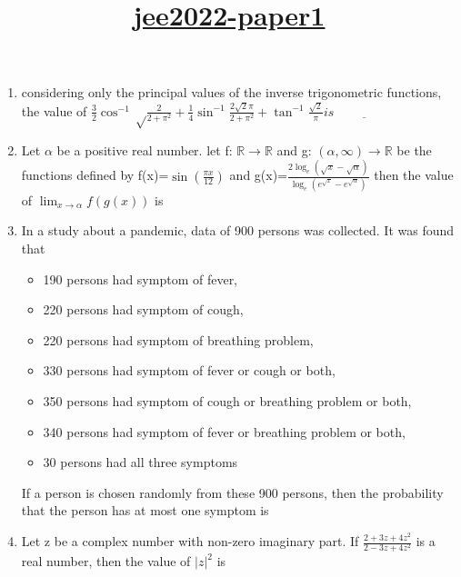\documentclass{article}
\title{\underline{\textbf{jee2022-paper1}}}
\date{}
\begin{document}
\maketitle
\begin{enumerate}
	\item considering only the principal values of the inverse trigonometric functions, the value of
		$\frac{3}{2} \cos^{-1} \sqrt\frac{2}{2+\pi^{2}} + \frac{1}{4} \sin^{-1}\frac{2\sqrt{2}\pi}{2+\pi^{2}} + \tan^{-1}\frac{\sqrt{2}}{\pi}is \underline{\hspace{2cm}}$

	\item Let $\alpha$ be a positive real number. let f: $\mathbb{R} \to \mathbb{R}$ and g: $(\alpha, \infty) \to \mathbb{R}$ be the functions defined by 
		f(x)=$\sin(\frac{\pi x}{12})$ and g(x)=$\frac{2\log_e(\sqrt{x}-\sqrt{\alpha})}{\log_e(e^{\sqrt{x}}-e^{\sqrt{\alpha}})}$
then the value of $\lim_{x \to \alpha}f(g(x))$ is 
\underline{\hspace{2cm}}
	
	\item In a study about a pandemic, data of 900 persons was collected. It was found that\\ 
\begin{itemize}
  \item 190 persons had symptom of fever, 
  \item 220 persons had symptom of cough, 
  \item	220 persons had symptom of breathing problem, 
  \item	330 persons had symptom of fever or cough or both,
  \item	350 persons had symptom of cough or breathing problem or both, 
  \item 340 persons had symptom of fever or breathing problem or both, 
  \item	30 persons had all three symptoms 
\end{itemize}

	If a person is chosen randomly from these 900 persons, then the probability that the person has at 
most one symptom is      \underline{\hspace{2cm}}

	\item Let z be a complex number with non-zero imaginary part.
		If    $\frac{2+3z+4z^2}{2-3z+4z^2}$
		is a real number, then the value of $|z|^2$ is \underline{\hspace{2cm}}


\end{enumerate}
\end{document}

